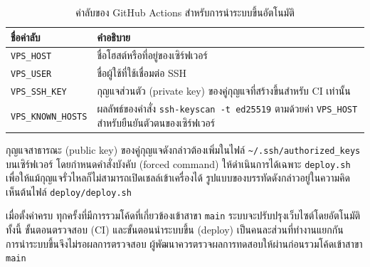 \begin{table}[H]
\caption{ค่าลับของ GitHub Actions สำหรับการนำระบบขึ้นอัตโนมัติ}
\label{tab:gh-secrets}
\centering
\small
\begin{tabular}{|L{4.0cm}|L{8.4cm}|}
\hline
\textbf{ชื่อค่าลับ} & \textbf{คำอธิบาย} \\
\hline
\texttt{VPS\_HOST} & ชื่อโฮสต์หรือที่อยู่ของเซิร์ฟเวอร์ \\
\hline
\texttt{VPS\_USER} & ชื่อผู้ใช้ที่ใช้เชื่อมต่อ SSH \\
\hline
\texttt{VPS\_SSH\_KEY} & กุญแจส่วนตัว (private key) ของคู่กุญแจที่สร้างขึ้นสำหรับ CI เท่านั้น \\
\hline
\texttt{VPS\_KNOWN\_HOSTS} & ผลลัพธ์ของคำสั่ง \texttt{ssh-keyscan -t ed25519} ตามด้วยค่า \texttt{VPS\_HOST} สำหรับยืนยันตัวตนของเซิร์ฟเวอร์ \\
\hline
\end{tabular}
\end{table}

กุญแจสาธารณะ (public key) ของคู่กุญแจดังกล่าวต้องเพิ่มในไฟล์ \texttt{\textasciitilde/.ssh/authorized\_keys} บนเซิร์ฟเวอร์ โดยกำหนดคำสั่งบังคับ (forced command) ให้ดำเนินการได้เฉพาะ \texttt{deploy.sh} เพื่อให้แม้กุญแจรั่วไหลก็ไม่สามารถเปิดเชลล์เข้าเครื่องได้ รูปแบบของบรรทัดดังกล่าวอยู่ในความคิดเห็นต้นไฟล์ \texttt{deploy/deploy.sh}

เมื่อตั้งค่าครบ ทุกครั้งที่มีการรวมโค้ดที่เกี่ยวข้องเข้าสาขา \texttt{main} ระบบจะปรับปรุงเว็บไซต์โดยอัตโนมัติ ทั้งนี้ ขั้นตอนตรวจสอบ (CI) และขั้นตอนนำระบบขึ้น (deploy) เป็นคนละส่วนที่ทำงานแยกกัน การนำระบบขึ้นจึงไม่รอผลการตรวจสอบ ผู้พัฒนาควรตรวจผลการทดสอบให้ผ่านก่อนรวมโค้ดเข้าสาขา \texttt{main}
